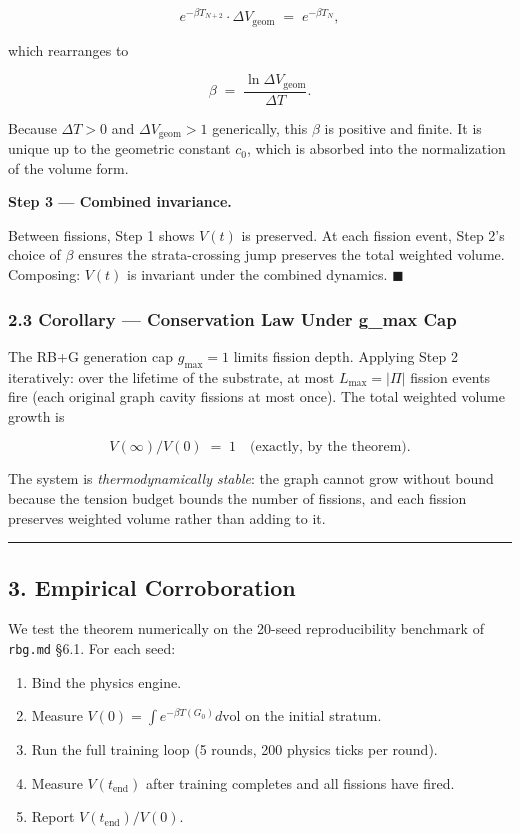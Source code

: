 \documentclass[
  11pt,
  a4paper,
]{article}
\providecommand{\tightlist}{%
  \setlength{\itemsep}{0pt}\setlength{\parskip}{0pt}}
\begin{document}
\[
e^{-\beta T_{N+2}} \cdot \Delta V_\text{geom} \;=\; e^{-\beta T_N},
\]

which rearranges to

\[
\boxed{\;\beta \;=\; \frac{\ln \Delta V_\text{geom}}{\Delta T}. \;}
\]

Because \(\Delta T > 0\) and \(\Delta V_\text{geom} > 1\) generically,
this \(\beta\) is positive and finite. It is unique up to the geometric
constant \(c_0\), which is absorbed into the normalization of the volume
form.

\textbf{Step 3 --- Combined invariance.}

Between fissions, Step 1 shows \(V(t)\) is preserved. At each fission
event, Step 2's choice of \(\beta\) ensures the strata-crossing jump
preserves the total weighted volume. Composing: \(V(t)\) is invariant
under the combined dynamics. \(\blacksquare\)

\subsubsection{2.3 Corollary --- Conservation Law Under g\_max
Cap}\label{corollary-conservation-law-under-g_max-cap}

The RB+G generation cap \(g_\text{max} = 1\) limits fission depth.
Applying Step 2 iteratively: over the lifetime of the substrate, at most
\(L_\text{max} = |\Pi|\) fission events fire (each original graph cavity
fissions at most once). The total weighted volume growth is

\[
V(\infty) / V(0) \;=\; 1 \quad \text{(exactly, by the theorem)}.
\]

The system is \emph{thermodynamically stable}: the graph cannot grow
without bound because the tension budget bounds the number of fissions,
and each fission preserves weighted volume rather than adding to it.

\begin{center}\rule{0.5\linewidth}{0.5pt}\end{center}

\subsection{3. Empirical Corroboration}\label{empirical-corroboration}

We test the theorem numerically on the 20-seed reproducibility benchmark
of \texttt{rbg.md} §6.1. For each seed:

\begin{enumerate}
\def\labelenumi{\arabic{enumi}.}
\tightlist
\item
  Bind the physics engine.
\item
  Measure \(V(0) = \int e^{-\beta T(G_0)} d\text{vol}\) on the initial
  stratum.
\item
  Run the full training loop (5 rounds, 200 physics ticks per round).
\item
  Measure \(V(t_{\text{end}})\) after training completes and all
  fissions have fired.
\item
  Report \(V(t_\text{end}) / V(0)\).
\end{enumerate}
\end{document}
